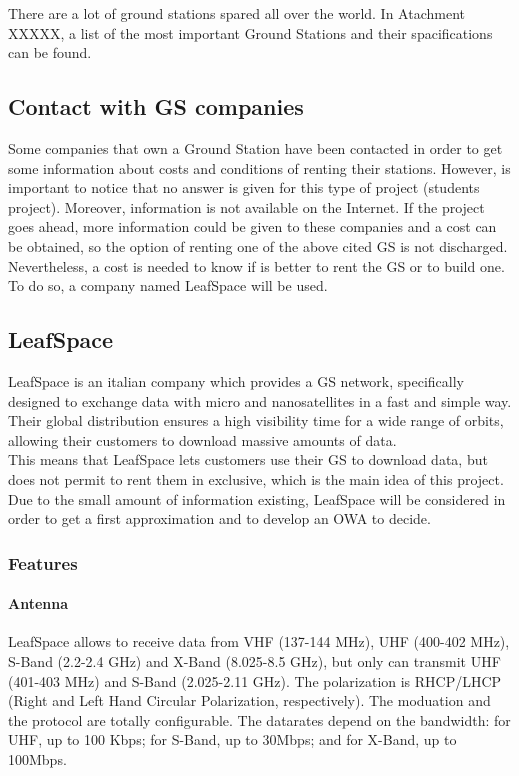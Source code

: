 There are a lot of ground stations spared all over the world. In Atachment XXXXX, a list of the most important Ground Stations and their spacifications can be found.

\subsection{Contact with GS companies}
Some companies that own a Ground Station have been contacted in order to get some information about costs and conditions of renting their stations. However, is important to notice that no answer is given for this type of project (students project). Moreover, information is not available on the Internet. If the project goes ahead, more information could be given to these companies and a cost can be obtained, so the option of renting one of the above cited GS is not discharged. Nevertheless, a cost is needed to know if is better to rent the GS or to build one. To do so, a company named LeafSpace will be used.

\subsection{LeafSpace}
LeafSpace is an italian company which provides a GS network, specifically designed to exchange data with micro and nanosatellites in a fast and simple way. Their global distribution ensures a high visibility time for a wide range of orbits, allowing their customers to download massive amounts of data. \\
This means that LeafSpace lets customers use their GS to download data, but does not permit to rent them in exclusive, which is the main idea of this project. Due to the small amount of information existing, LeafSpace will be considered in order to get a first approximation and to develop an OWA to decide. 

\subsubsection{Features}
\paragraph{Antenna}
LeafSpace allows to receive data from VHF (137-144 MHz), UHF (400-402 MHz), S-Band (2.2-2.4 GHz) and X-Band (8.025-8.5 GHz), but only can transmit UHF (401-403 MHz) and S-Band (2.025-2.11 GHz). The polarization is RHCP/LHCP (Right and Left Hand Circular Polarization, respectively). The moduation and the protocol are totally configurable. The datarates depend on the bandwidth: for UHF, up to 100 Kbps; for S-Band, up to 30Mbps; and for X-Band, up to 100Mbps. 

